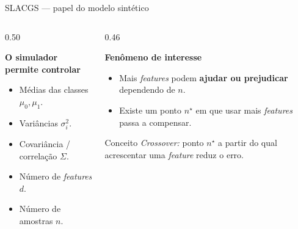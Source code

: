 \documentclass[aspectratio=169, 11pt]{beamer}
\begin{document}
\begin{frame}{SLACGS --- papel do modelo sintético}

\begin{columns}[T]
\begin{column}{0.50\textwidth}

\textbf{O simulador permite controlar}
\begin{itemize}
  \item Médias das classes $\mu_0, \mu_1$.
  \item Variâncias $\sigma_i^2$.
  \item Covariância / correlação $\Sigma$.
  \item Número de \textit{features} $d$.
  \item Número de amostras $n$.
\end{itemize}

\end{column}
\begin{column}{0.46\textwidth}

\textbf{Fenômeno de interesse}
\begin{itemize}
  \item Mais \textit{features} podem \textbf{ajudar ou prejudicar}
        dependendo de $n$.
  \item Existe um ponto $n^{\star}$ em que usar
        mais \textit{features} passa a compensar.
\end{itemize}

\vspace{0.4em}
\begin{block}{Conceito}
\centering
\textit{Crossover:} ponto $n^{\star}$ a partir do qual
acrescentar uma \textit{feature} reduz o erro.
\end{block}

\end{column}
\end{columns}

\end{frame}
\end{document}
